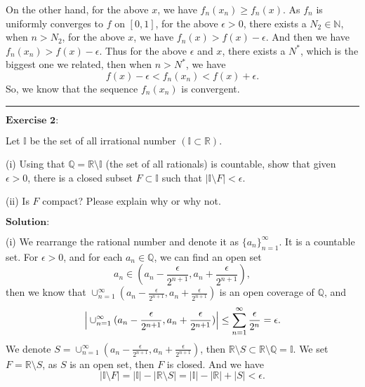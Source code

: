 \documentclass[12pt]{article}
\begin{document}
On the other hand, for the above $x$, we have $f_{n}(x_{n}) \geq f_{n}(x)$. As $f_{n}$ is uniformly converges to $f$ on $[0, 1]$, for the above $\epsilon > 0$, there exists a $N_{2} \in \mathbb{N}$, when $n > N_{2}$, for the above $x$, we have $f_{n}(x) > f(x) - \epsilon$. And then we have $f_{n}(x_{n}) > f(x) - \epsilon$. Thus for the above $\epsilon$ and $x$, there exists a $N^{*}$, which is the biggest one we related, then when $n > N^{*}$, we have
\begin{equation*}
    f(x) - \epsilon < f_{n}(x_{n}) < f(x) + \epsilon .
\end{equation*}
So, we know that the sequence $f_{n}(x_{n})$ is convergent.

\vspace{8pt}

\noindent\rule[0.25\baselineskip]{\textwidth}{0.5pt}

$\textbf{Exercise 2:}$

Let $\mathbb{I}$ be the set of all irrational number $(\mathbb{I} \subset \mathbb{R})$.

(i) Using that $\mathbb{Q} = \mathbb{R} \setminus \mathbb{I}$ (the set of all rationals) is countable, show that given $\epsilon > 0$, there is a closed subset $F \subset \mathbb{I}$ such that $|\mathbb{I} \setminus F| < \epsilon$.

(ii) Is $F$ compact? Please explain why or why not.
 
\vspace{8pt}
$\textbf{Solution:}$

(i) We rearrange the rational number and denote it as $\{a_{n}\}_{n=1}^{\infty}$. It is a countable set. For $\epsilon > 0$, and for each $a_{n} \in \mathbb{Q}$, we can find an open set
\begin{equation*}
    a_{n} \in (a_{n} - \frac{\epsilon}{2^{n+1}}, a_{n} + \frac{\epsilon}{2^{n+1}}),
\end{equation*}
then we know that $\cup_{n=1}^{\infty} (a_{n} - \frac{\epsilon}{2^{n+1}}, a_{n} + \frac{\epsilon}{2^{n+1}}) $ is an open coverage of $\mathbb{Q}$, and
\begin{equation*}
    \Big{|} \cup_{n=1}^{\infty} (a_{n} - \frac{\epsilon}{2^{n+1}}, a_{n} + \frac{\epsilon}{2^{n+1}}) \Big{|} \leq \sum_{n=1}^{\infty} \frac{\epsilon}{2^{n}} = \epsilon.
\end{equation*}
We denote $S = \cup_{n=1}^{\infty} (a_{n} - \frac{\epsilon}{2^{n+1}}, a_{n} + \frac{\epsilon}{2^{n+1}})$, then $\mathbb{R} \setminus S \subset \mathbb{R} \setminus \mathbb{Q} = \mathbb{I}$. We set $F = \mathbb{R} \setminus S$, as $S$ is an open set, then $F$ is closed. And we have
\begin{equation*}
    |\mathbb{I} \setminus F| = |\mathbb{I}| - |\mathbb{R} \setminus S| = |\mathbb{I}| - |\mathbb{R} | + |S| < \epsilon.
\end{equation*}
\end{document}
